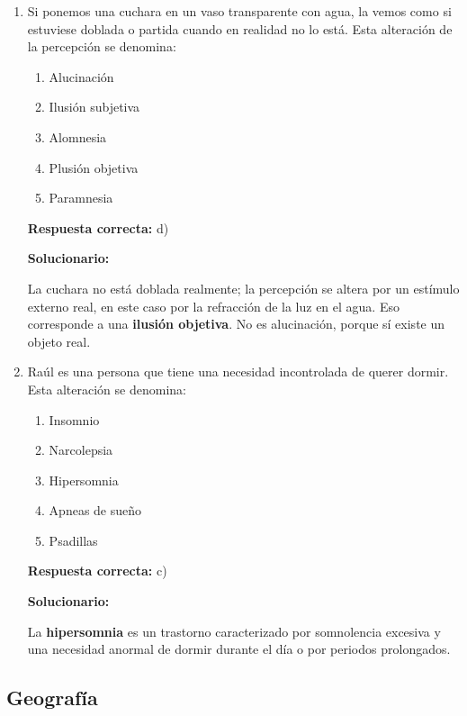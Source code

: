 \begin{enumerate}[resume]
	\vspace{6mm}
	
	\item Si ponemos una cuchara en un vaso transparente con agua, la vemos como si estuviese doblada o partida cuando en realidad no lo está. Esta alteración de la percepción se denomina:
	\begin{enumerate}[label=\alph*)]
		\item Alucinación
		\item Ilusión subjetiva
		\item Alomnesia
		\item Plusión objetiva
		\item Paramnesia
	\end{enumerate}
	\textbf{Respuesta correcta:} d)
	
	\vspace{2mm}
	\textbf{Solucionario:}
	
	La cuchara no está doblada realmente; la percepción se altera por un estímulo externo real, en este caso por la refracción de la luz en el agua. Eso corresponde a una \textbf{ilusión objetiva}. No es alucinación, porque sí existe un objeto real.
	
	\vspace{6mm}
	
	\item Raúl es una persona que tiene una necesidad incontrolada de querer dormir. Esta alteración se denomina:
	\begin{enumerate}[label=\alph*)]
		\item Insomnio
		\item Narcolepsia
		\item Hipersomnia
		\item Apneas de sueño
		\item Psadillas
	\end{enumerate}
	\textbf{Respuesta correcta:} c)
	
	\vspace{2mm}
	\textbf{Solucionario:}
	
	La \textbf{hipersomnia} es un trastorno caracterizado por somnolencia excesiva y una necesidad anormal de dormir durante el día o por periodos prolongados.\\

	
	\vspace{6mm}
	
\end{enumerate}

\subsection*{Geografía}

